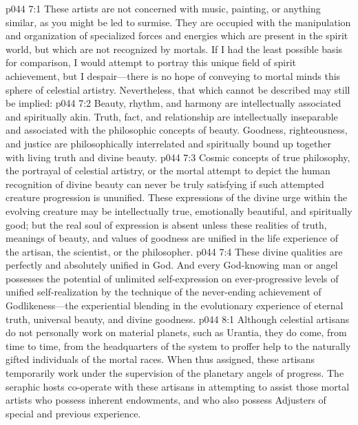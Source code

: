 \vs p044 7:1 These artists are not concerned with music, painting, or anything similar, as you might be led to surmise. They are occupied with the manipulation and organization of specialized forces and energies which are present in the spirit world, but which are not recognized by mortals. If I had the least possible basis for comparison, I would attempt to portray this unique field of spirit achievement, but I despair---there is no hope of conveying to mortal minds this sphere of celestial artistry. Nevertheless, that which cannot be described may still be implied:
\vs p044 7:2 Beauty, rhythm, and harmony are intellectually associated and spiritually akin. Truth, fact, and relationship are intellectually inseparable and associated with the philosophic concepts of beauty. Goodness, righteousness, and justice are philosophically interrelated and spiritually bound up together with living truth and divine beauty.
\vs p044 7:3 Cosmic concepts of true philosophy, the portrayal of celestial artistry, or the mortal attempt to depict the human recognition of divine beauty can never be truly satisfying if such attempted creature progression is ununified. These expressions of the divine urge within the evolving creature may be intellectually true, emotionally beautiful, and spiritually good; but the real soul of expression is absent unless these realities of truth, meanings of beauty, and values of goodness are unified in the life experience of the artisan, the scientist, or the philosopher.\plusone
\vs p044 7:4 These divine qualities are perfectly and absolutely unified in God. And every God\hyp{}knowing man or angel possesses the potential of unlimited self\hyp{}expression on ever\hyp{}progressive levels of unified self\hyp{}realization by the technique of the never\hyp{}ending achievement of Godlikeness---the experiential blending in the evolutionary experience of eternal truth, universal beauty, and divine goodness.
\vs p044 8:1 Although celestial artisans do not personally work on material planets, such as Urantia, they do come, from time to time, from the headquarters of the system to proffer help to the naturally gifted individuals of the mortal races. When thus assigned, these artisans temporarily work under the supervision of the planetary angels of progress. The seraphic hosts co\hyp{}operate with these artisans in attempting to assist those mortal artists who possess inherent endowments, and who also possess Adjusters of special and previous experience.
